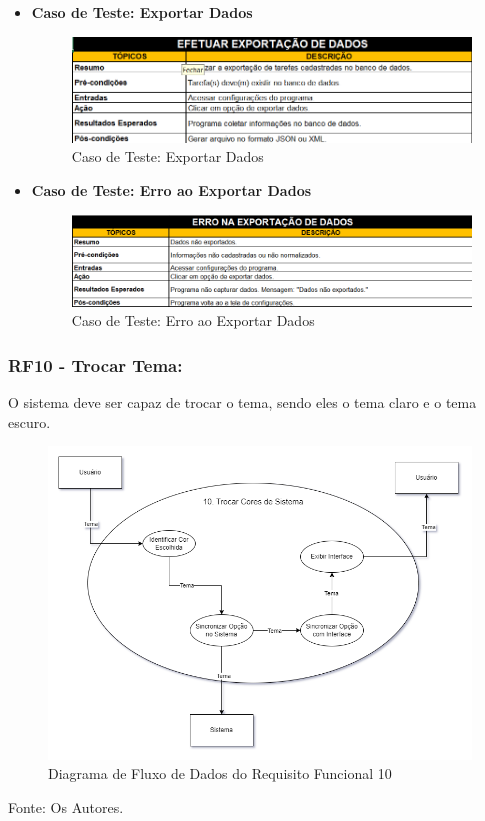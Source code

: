 \documentclass[a4paper,12pt]{article}
\begin{document}
\pagebreak
\begin{itemize}
	\item\textbf{Caso de Teste: Exportar Dados}
	\begin{figure}[H]
		\centering
		\includegraphics[scale=0.65]{UnitTest/trueCase/exportData.png}
		\caption{Caso de Teste: Exportar Dados}
	\end{figure}

	\item\textbf{Caso de Teste: Erro ao Exportar Dados}
	\begin{figure}[H]
		\centering
		\includegraphics[scale=0.65]{UnitTest/falseCase/exportData.png}
		\caption{Caso de Teste: Erro ao Exportar Dados}
	\end{figure}
\end{itemize}

\pagebreak
\subsubsection{RF10 - Trocar Tema:}
O sistema deve ser capaz de trocar o tema, sendo eles o tema claro e o tema escuro.
\begin{figure}[H]
	\centering
	\includegraphics[scale=0.45]{DFDs/RF10.drawio.png}
	\caption{Diagrama de Fluxo de Dados do Requisito Funcional 10}
\end{figure}
\noindent Fonte: Os Autores.
\end{document}
